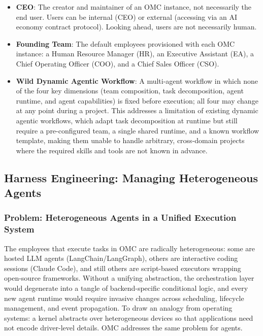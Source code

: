 \documentclass[11pt,a4paper]{article}
\begin{document}
\begin{itemize}
    \item \textbf{CEO}: The creator and maintainer of an OMC instance, not necessarily the end user.  Users can be internal (CEO) or external (accessing via an AI economy contract protocol).  Looking ahead, users are not necessarily human.
    \item \textbf{Founding Team}: The default employees provisioned with each OMC instance: a Human Resource Manager (HR), an Executive Assistant (EA), a Chief Operating Officer (COO), and a Chief Sales Officer (CSO).
    \item \textbf{Wild Dynamic Agentic Workflow}: A multi-agent workflow in which none of the four key dimensions (team composition, task decomposition, agent runtime, and agent capabilities) is fixed before execution; all four may change at any point during a project.  This addresses a limitation of existing dynamic agentic workflows, which adapt task decomposition at runtime but still require a pre-configured team, a single shared runtime, and a known workflow template, making them unable to handle arbitrary, cross-domain projects where the required skills and tools are not known in advance.
\end{itemize}

\subsection{Harness Engineering: Managing Heterogeneous Agents}
\label{sec:harness}

\subsubsection{Problem: Heterogeneous Agents in a Unified Execution System}

The employees that execute tasks in OMC are radically heterogeneous: some are hosted LLM agents (LangChain/LangGraph), others are interactive coding sessions (Claude Code), and still others are script-based executors wrapping open-source frameworks.  Without a unifying abstraction, the orchestration layer would degenerate into a tangle of backend-specific conditional logic, and every new agent runtime would require invasive changes across scheduling, lifecycle management, and event propagation.  To draw an analogy from operating systems: a kernel abstracts over heterogeneous devices so that applications need not encode driver-level details.  OMC addresses the same problem for agents.
\end{document}
